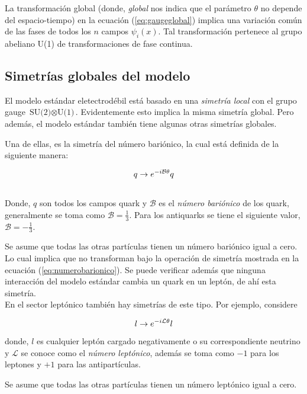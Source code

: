 \documentclass[12pt]{article}
\begin{document}
La transformación global (donde, \textit{global} nos indica que el parámetro $\theta$ no depende del espacio-tiempo) en la ecuación (\ref{eq:gaugeglobal}) implica una variación común de las fases de todos los $n$ campos $\psi_i(x)$. Tal transformación pertenece al grupo abeliano U(1) de transformaciones de fase continua. 

\subsection{Simetrías globales del modelo}

El modelo estándar eletectrodébil está basado en una \textit{simetría local } con el grupo gauge $\text{SU(2)} \otimes \text{U(1)}$. Evidentemente esto implica la misma simetría global. Pero además, el modelo estándar también tiene algunas otras simetrías globales.

Una de ellas, es la simetría del número bariónico, la cual está definida de la siguiente manera: 

\begin{equation}
\centering
q \rightarrow e^ {-i\mathcal{B}\theta}q
    \label{eq:numerobarionico}
\end{equation} \\ 
Donde, $q$ son todos los campos quark y $\mathcal{B}$ es el \textit{número bariónico} de los quark, generalmente se toma como $\mathcal{B}= \frac{1}{3}$. Para los antiquarks se tiene el siguiente valor, $\mathcal{B}= - \frac{1}{3}$.

Se asume que todas las otras partículas tienen un número bariónico igual a cero. Lo cual implica que no transforman bajo  la operación de simetría mostrada en la ecuación (\ref{eq:numerobarionico}). Se puede verificar además que ninguna interacción del modelo estándar cambia un quark en un leptón, de ahí esta simetría. \\ 

En el sector leptónico también hay simetrías de este tipo. Por ejemplo, considere 

\begin{equation}
\centering
l \rightarrow e^ {-i\mathcal{L}\theta}l
    \label{eq:numeroleptonico}
\end{equation} 
donde, $l$ es cualquier leptón cargado negativamente o su correspondiente neutrino y  $\mathcal{L}$ se conoce como el \textit{número leptónico}, además se toma como $-1$ para los leptones y $+1 $ para las antipartículas.

Se asume que todas las otras partículas tienen un número leptónico igual a cero. 
\end{document}
